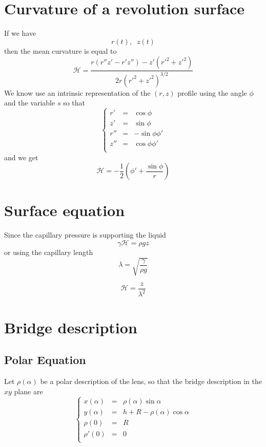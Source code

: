 \documentclass[aps,onecolumn]{revtex4}
\begin{document}
\section{Curvature of a revolution surface}

If we have
\begin{equation}
	r(t),\;\; z(t)
\end{equation}
then the mean curvature is equal to
\begin{equation}
	\mathcal{H} =  \dfrac{
		r \left(r''z'-r'z''\right)  - z' \left(r'^2+z'^2\right)
	}
	{
		2r\left(r'^2+z'^2\right)^{3/2}
	}
\end{equation}
We know use an intrinsic representation of the $(r,z)$ profile using the
angle $\phi$ and the variable $s$ so that
\begin{equation}
\left\lbrace
	\begin{array}{rcl}
	r' & = & \cos \phi\\
	z' & = & \sin \phi\\
	r'' & = & -\sin\phi \phi'\\
	z'' & = & \cos\phi  \phi'\\
	\end{array}
\right.
\end{equation}
and we get
\begin{equation}
	\mathcal{H} = -\frac{1}{2} \left(\phi'+\dfrac{\sin\phi}{r}\right)
\end{equation}

\section{Surface equation}
Since the capillary pressure is supporting the liquid
\begin{equation}
	\gamma \mathcal{H} = \rho g z
\end{equation}
or using the capillary length
\begin{equation}
	\lambda = \sqrt{\dfrac{\gamma}{\rho g}}
\end{equation}

\begin{equation}
	\mathcal{H} = \dfrac{z}{\lambda^2}
\end{equation}

\section{Bridge description}
\subsection{Polar Equation}
Let $\rho(\alpha)$ be a polar description of the lens, so that the bridge description in the $xy$ plane are
\begin{equation}
	\left\lbrace
	\begin{array}{rcl}
	x(\alpha) & = & \rho(\alpha)\sin\alpha\\
	y(\alpha) & = & h + R - \rho(\alpha)\cos\alpha\\
	\rho(0)   & = & R\\
	\rho'(0)  & = & 0\\
	\end{array}
	\right.
\end{equation}
\end{document}
